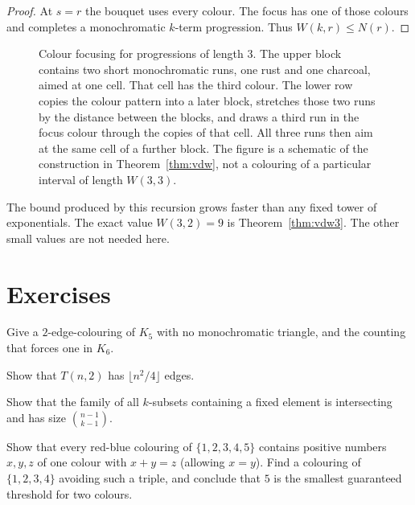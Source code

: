 \begin{proof}
At $s=r$ the bouquet uses every colour. The focus has one of those colours and completes a monochromatic $k$-term progression. Thus $W(k,r)\le N(r)$.
\end{proof}

\begin{figure}[ht]
\centering
{}
\caption{Colour focusing for progressions of length $3$. The upper block contains two short monochromatic runs, one rust and one charcoal, aimed at one cell. That cell has the third colour. The lower row copies the colour pattern into a later block, stretches those two runs by the distance between the blocks, and draws a third run in the focus colour through the copies of that cell. All three runs then aim at the same cell of a further block. The figure is a schematic of the construction in Theorem~\ref{thm:vdw}, not a colouring of a particular interval of length $W(3,3)$.}
\label{fig:vdwfocus}
\end{figure}

The bound produced by this recursion grows faster than any fixed tower of exponentials. The exact value $W(3,2)=9$ is Theorem~\ref{thm:vdw3}. The other small values are not needed here.

\section{Exercises}

\begin{exercise}[$\star$]\label{ex:r33}
Give a $2$-edge-colouring of $K_5$ with no monochromatic triangle, and the counting that forces one in $K_6$.
\end{exercise}

\begin{exercise}[$\star\star$]\label{ex:turanedges}
Show that $T(n,2)$ has $\lfloor n^2/4\rfloor$ edges.
\end{exercise}

\begin{exercise}[$\star\star$]\label{ex:ekrsharp}
Show that the family of all $k$-subsets containing a fixed element is intersecting and has size $\binom{n-1}{k-1}$.
\end{exercise}

\begin{exercise}[$\star\star$]\label{ex:schurtwo}
Show that every red-blue colouring of $\{1,2,3,4,5\}$ contains positive numbers $x,y,z$ of one colour with $x+y=z$ (allowing $x=y$). Find a colouring of $\{1,2,3,4\}$ avoiding such a triple, and conclude that $5$ is the smallest guaranteed threshold for two colours.
\end{exercise}

